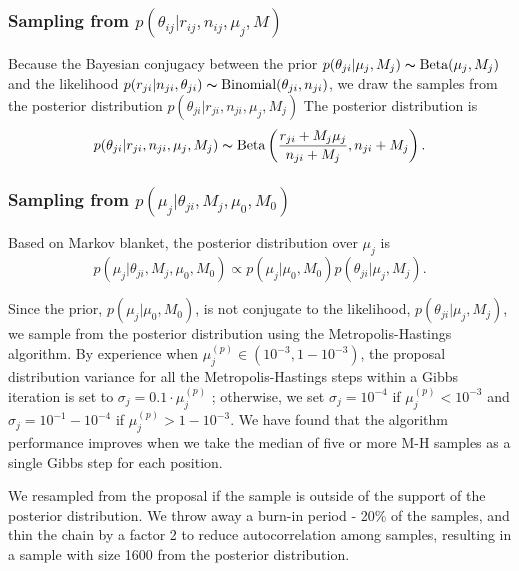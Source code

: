 \documentclass[11pt,reqno]{amsart}
\begin{document}
\subsubsection{Sampling from $p \left( \theta_{ij} |r_{ij},n_{ij},\mu_j,M \right)$}

Because the Bayesian conjugacy between the prior
$p(\theta_{ji} | \mu_j, M_j) \thicksim \text{Beta}(\mu_j, M_j)$
and the likelihood
$p(r_{ji} | n_{ji}, \theta_{ji}) \thicksim \text{Binomial}(\theta_{ji}, n_{ji})$,
we draw the samples from the posterior distribution
$p(\theta_{ji} | r_{ji}, n_{ji}, \mu_j, M_j)$
The posterior distribution is
\begin{equation}
	p(\theta_{ji} | r_{ji}, n_{ji}, \mu_j, M_j) \thicksim \text{Beta}\left( \frac{r_{ji} + M_j \mu_j}{n_{ji} + M_j} , n_{ji} + M_j\right).
\end{equation}

\subsubsection{Sampling from $p \left( \mu_j |\theta_{ji},M_j,\mu_0,M_0\right)$}
Based on Markov blanket, the posterior distribution over $\mu_j$ is
\begin{equation}
	p( \mu_j | \theta_{ji}, M_j, \mu_0, M_0 ) \propto p(\mu_j | \mu_0, M_0) p(\theta_{ji} | \mu_j, M_j).
\end{equation}

Since the prior, $p(\mu_j | \mu_0, M_0)$, is not conjugate to the likelihood, $p(\theta_{ji} | \mu_j, M_j)$, we sample from the posterior distribution using the Metropolis-Hastings algorithm.
By experience when $\mu_j^{(p)} \in (10^{-3},1-10^{-3})$, the proposal distribution variance for all the Metropolis-Hastings steps within a Gibbs iteration is set to $\sigma_j = 0.1 \cdot \mu_j^{(p)}$ ;
otherwise, we set $\sigma_j = 10^{-4}$ if $\mu_j^{(p)}< 10^{-3}$ and $\sigma_j = 10^{-1}-10^{-4}$ if $\mu_j^{(p)}>1-10^{-3}$.
We have found that the algorithm performance improves when we take the median of five or more M-H samples as a single Gibbs step for each position.

We resampled from the proposal if the sample is outside of the support of the posterior distribution.
We throw away a burn-in period - 20\% of the samples, and thin the chain by a factor 2 to reduce autocorrelation among samples, resulting in a sample with size 1600 from the posterior distribution.
\end{document}

